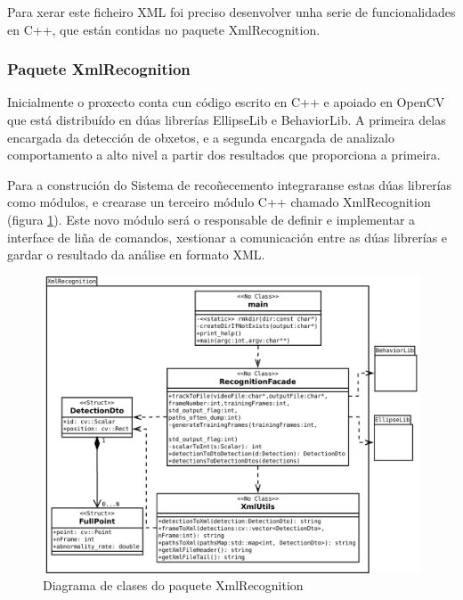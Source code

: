             Para xerar este ficheiro XML foi preciso desenvolver unha serie de funcionalidades en C++,
            que están contidas no paquete XmlRecognition.
        
        \subsubsection{Paquete XmlRecognition}
            Inicialmente o proxecto conta cun código escrito en C++ e apoiado en OpenCV que está distribuído en
            dúas librerías EllipseLib e BehaviorLib. A primeira delas encargada da detección de obxetos, e a segunda
            encargada de analizalo comportamento a alto nivel a partir dos resultados que proporciona a primeira.
            
            Para a construción do Sistema de recoñecemento integraranse estas dúas librerías como módulos, e 
            crearase un terceiro módulo C++ chamado XmlRecognition (figura \ref{fig:PaqXmlRecognition}).
            Este novo módulo será o responsable de definir e implementar a interface de liña de 
            comandos, xestionar a comunicación entre as dúas librerías e gardar o resultado da análise
            en formato XML.
            
            \begin{figure}[htp]
            \begin{center}
                \includegraphics[scale=0.4]{figures/PaqXmlRecognition.pdf}
                \caption{Diagrama de clases do paquete XmlRecognition}
            \label{fig:PaqXmlRecognition}
            \end{center}
            \end{figure}
            
